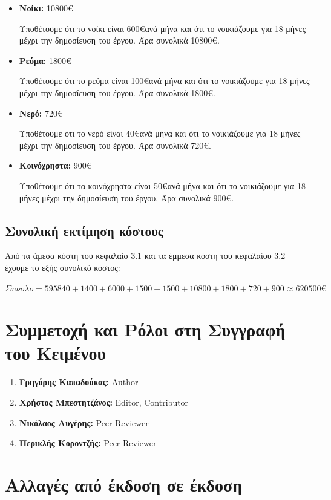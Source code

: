 \documentclass[12pt,a4paper]{article}
\begin{document}
\begin{itemize}
	\item \textbf{Νοίκι:} 10800\euro

		Υποθέτουμε ότι το νοίκι είναι 600\euro\space ανά μήνα και ότι το νοικιάζουμε για 18 μήνες μέχρι την δημοσίευση του έργου. Άρα συνολικά 10800\euro.

	\item \textbf{Ρεύμα:} 1800\euro

		Υποθέτουμε ότι το ρεύμα είναι 100\euro\space ανά μήνα και ότι το νοικιάζουμε για 18 μήνες μέχρι την δημοσίευση του έργου. Άρα συνολικά 1800\euro.

	\item \textbf{Νερό:} 720\euro

		Υποθέτουμε ότι το νερό είναι 40\euro\space ανά μήνα και ότι το νοικιάζουμε για 18 μήνες μέχρι την δημοσίευση του έργου. Άρα συνολικά 720\euro.

	\item \textbf{Κοινόχρηστα:} 900\euro

		Υποθέτουμε ότι τα κοινόχρηστα είναι 50\euro\space ανά μήνα και ότι το νοικιάζουμε για 18 μήνες μέχρι την δημοσίευση του έργου. Άρα συνολικά 900\euro.
\end{itemize}

\subsection{Συνολική εκτίμηση κόστους}

Από τα άμεσα κόστη του κεφαλαίο 3.1 και τα έμμεσα κόστη του κεφαλαίου 3.2 έχουμε το εξής συνολικό κόστος:

$Συνολο = 595840 + 1400 + 6000 + 1500 + 1500 + 10800 + 1800 + 720 + 900 \approx 620500\euro$

\section{Συμμετοχή και Ρόλοι στη Συγγραφή του Κειμένου}
\begin{enumerate}
	\item \textbf{Γρηγόρης Καπαδούκας:} Author
	\item \textbf{Χρήστος Μπεστητζάνος:} Editor, Contributor
	\item \textbf{Νικόλαος Αυγέρης:} Peer Reviewer
	\item \textbf{Περικλής Κοροντζής:} Peer Reviewer
\end{enumerate}

\section{Αλλαγές από έκδοση σε έκδοση}
\end{document}
